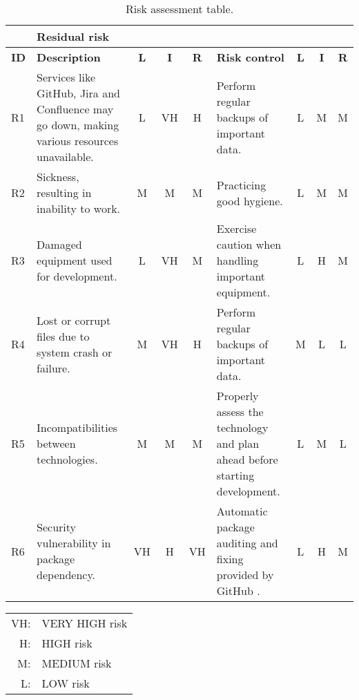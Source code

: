 \begingroup
\renewcommand{\tabularxcolumn}[1]{m{#1}} %
\begin{table}[H]
\caption{Risk assessment table.}
\label{tab:risk-assessment}
\begin{tabularx}{\textwidth}{ |l|X|c|c|c|X|c|c|c| }
	\hhline{*{6}{|~}*{3}{|-}}
	\multicolumn{6}{X}{}& \multicolumn{3}{|l|}{\textbf{Residual risk}} \\
	\hline
	\textbf{ID} & \textbf{Description} & \textbf{L} & \textbf{I} & \textbf{R} & \textbf{Risk control} & \textbf{L} & \textbf{I} & \textbf{R} \\
	\hline
	R1
		& Services like GitHub, Jira and Confluence may go down, making various resources unavailable.
		& L & VH & \cellcolor{orange!15}H
		& Perform regular backups of important data.
		& L & M & \cellcolor{yellow!15}M\\
	\hline
	R2
		& Sickness, resulting in inability to work.
		& M & M & \cellcolor{yellow!15}M
		& Practicing good hygiene.
		& L & M & \cellcolor{yellow!15}M\\
	\hline
	R3
		& Damaged equipment used for development.
		& L & VH & \cellcolor{yellow!15}M
		& Exercise caution when handling important equipment.
		& L & H & \cellcolor{yellow!15}M \\
	\hline
	R4
		& Lost or corrupt files due to system crash or failure.
		& M & VH & \cellcolor{orange!15}H
		& Perform regular backups of important data.
		& M & L & \cellcolor{green!15}L \\
	\hline
	R5
		& Incompatibilities between technologies.
		& M & M & \cellcolor{yellow!15}M
		& Properly assess the technology and plan ahead before starting development.
		& L & M & \cellcolor{green!15}L \\
	\hline
	R6
		& Security vulnerability in package dependency.
		& VH & H & \cellcolor{red!15}VH
		& Automatic package auditing and fixing provided by GitHub \cite{github-security-vulnerabilities}.
		& L & H & \cellcolor{yellow!15}M \\
	\hline
\end{tabularx}

\end{table}
\begin{tabularx}{\textwidth}{ r@{\hspace*{2.5em}}l }
	VH: & VERY HIGH risk\\
	H: & HIGH risk \\
	M: & MEDIUM risk\\
	L: & LOW risk\\
\end{tabularx}
\endgroup
\vspace{1em}

